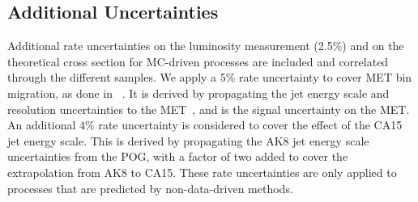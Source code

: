 \subsection{Additional Uncertainties}\label{sec:add}
Additional rate uncertainties on the luminosity measurement (2.5\%) and on the theoretical cross section for MC-driven processes are included and correlated through the different samples. 
We apply a $5\%$ rate uncertainty to cover MET bin migration, as done in ~\cite{CMS_AN_2016-473}. 
It is derived by propagating the jet energy scale and resolution uncertainties to the MET~\cite{JEC_TWIKI,JER_TWIKI}, and is the signal uncertainty on the MET.
An additional $4\%$ rate uncertainty is considered to cover the effect of the CA15 jet energy scale. 
This is derived by propagating the AK8 jet energy scale uncertainties from the POG, with a factor of two added to cover the extrapolation from AK8 to CA15.
These rate uncertainties are only applied to processes that are predicted by non-data-driven methods.
